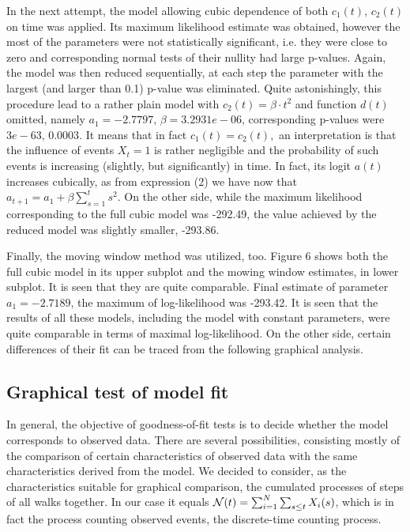 \documentclass[11pt]{article}
\begin{document}
In the next attempt, the model allowing cubic dependence of
both $c_1(t),\,c_2(t)$ on time was applied. Its maximum likelihood
estimate was obtained, however the most of the parameters were not
statistically significant, i.e. they were close to zero and
corresponding normal tests of their nullity had large p-values.
Again, the model was then reduced sequentially, at each step the
parameter with the largest (and larger than 0.1) p-value was
eliminated. Quite astonishingly, this procedure lead to a rather
plain model with $c_2(t)=\beta\cdot t^2$ and function $d(t)$
omitted, namely $a_1=-2.7797,\, \beta= 3.2931e-06$, corresponding
p-values were $3e-63,\,0.0003$. It means that in fact
$c_1(t)=c_2(t),$ an interpretation is that the influence of events
$X_t=1$ is rather negligible and the probability of such events is
increasing (slightly, but significantly) in time. In fact, its
logit $a(t)$ increases cubically, as from expression (2) we have
now that $a_{t+1}=a_1+\beta\sum_{s=1}^t s^2$. On the other side,
while the maximum likelihood corresponding to the full cubic
model was -292.49, the value achieved by the reduced model was
slightly smaller, -293.86.

Finally, the moving window method was utilized, too. Figure 6
shows both the full cubic model in its upper subplot and the
mowing window estimates, in lower subplot. It is seen that they
are quite comparable. Final estimate of parameter $ a_1 =
-2.7189$, the maximum of log-likelihood was -293.42.
 It is seen that the results of all these models, including the model
with constant parameters, were quite comparable in terms
of maximal log-likelihood. On the other side,
certain differences of their fit can
be traced from the following graphical analysis.


\subsection{Graphical test of model fit}

In general, the objective of goodness-of-fit tests is to decide
whether the model corresponds to observed data. There are several
possibilities, consisting mostly of the comparison of certain
characteristics of observed data with the same characteristics
derived from the model. We decided to consider, as the
characteristics suitable for graphical comparison, the cumulated
processes of steps of all walks together. In our case it equals
${\cal N}(t)=\sum_{i=1}^N \sum_{s\le t} X_i(s)$, which is in fact
the process counting observed events, the discrete-time counting
process.
\end{document}
